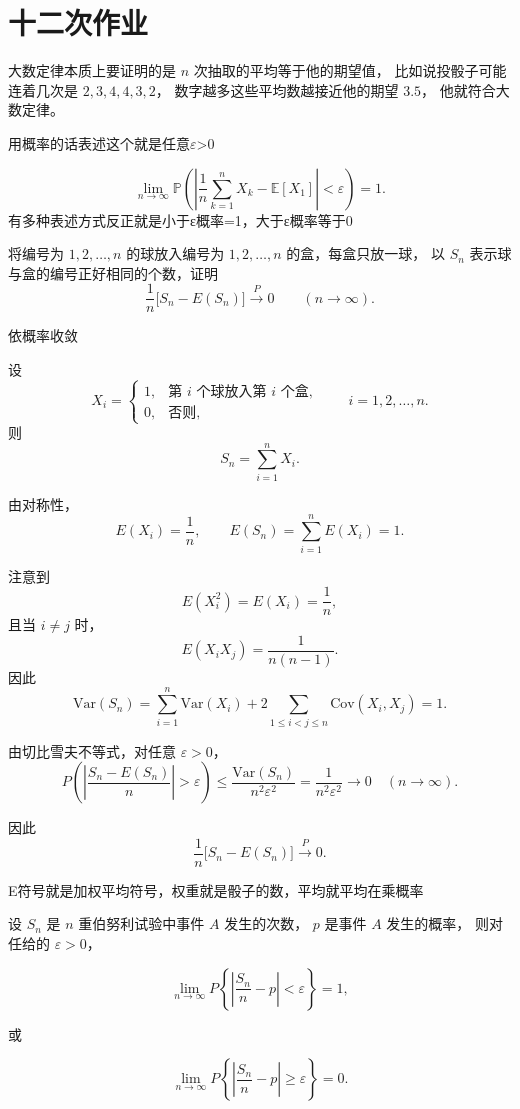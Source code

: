 \section{十二次作业}
\begin{dxtips}
   大数定律本质上要证明的是 $n$ 次抽取的平均等于他的期望值，
比如说投骰子可能连着几次是 $2,3,4,4,3,2$，
数字越多这些平均数越接近他的期望 $3.5$，
他就符合大数定律。

用概率的话表述这个就是任意$\varepsilon$>0

\[
\lim_{n\to\infty}
\mathbb P\!\left(
\left|
\frac{1}{n}\sum_{k=1}^{n} X_k - \mathbb E[X_1]
\right|
< \varepsilon
\right)
= 1.
\]
有多种表述方式反正就是小于ε概率=1，大于ε概率等于0
\end{dxtips}
\begin{homework}[5.3]
将编号为 $1,2,\ldots,n$ 的球放入编号为 $1,2,\ldots,n$ 的盒，每盒只放一球，
以 $S_n$ 表示球与盒的编号正好相同的个数，证明
\[
\frac1n \bigl[S_n - E(S_n)\bigr] \xrightarrow{P} 0 
\qquad (n\to\infty).
\]
\end{homework}
\begin{dxtips}
    依概率收敛
\end{dxtips}
\begin{solution}
设
\[
X_i=
\begin{cases}
1,& \text{第 $i$ 个球放入第 $i$ 个盒},\\
0,& \text{否则},
\end{cases}
\qquad i=1,2,\ldots,n.
\]
则
\[
S_n=\sum_{i=1}^n X_i.
\]

由对称性，
\[
E(X_i)=\frac{1}{n},
\qquad
E(S_n)=\sum_{i=1}^n E(X_i)=1.
\]

注意到
\[
E(X_i^2)=E(X_i)=\frac{1}{n},
\]
且当 $i\neq j$ 时，
\[
E(X_iX_j)=\frac{1}{n(n-1)}.
\]
因此
\[
\mathrm{Var}(S_n)
=\sum_{i=1}^n \mathrm{Var}(X_i)
+2\sum_{1\le i<j\le n}\mathrm{Cov}(X_i,X_j)
=1.
\]

由切比雪夫不等式，对任意 $\varepsilon>0$，
\[
P\!\left(
\left|\frac{S_n-E(S_n)}{n}\right|>\varepsilon
\right)
\le
\frac{\mathrm{Var}(S_n)}{n^2\varepsilon^2}
=\frac{1}{n^2\varepsilon^2}
\to 0 \quad (n\to\infty).
\]

因此
\[
\frac1n\bigl[S_n-E(S_n)\bigr]\xrightarrow{P}0.
\]
\end{solution}
\begin{dxtips}
    E符号就是加权平均符号，权重就是骰子的数，平均就平均在乘概率
\end{dxtips}
\begin{definition}
    设 $S_n$ 是 $n$ 重伯努利试验中事件 $A$ 发生的次数，
$p$ 是事件 $A$ 发生的概率，
则对任给的 $\varepsilon>0$，

\[
\lim_{n\to\infty}
P\!\left\{
\left|
\frac{S_n}{n}-p
\right|
<\varepsilon
\right\}
=1,
\]

或

\[
\lim_{n\to\infty}
P\!\left\{
\left|
\frac{S_n}{n}-p
\right|
\ge \varepsilon
\right\}
=0.
\]
\end{definition}
